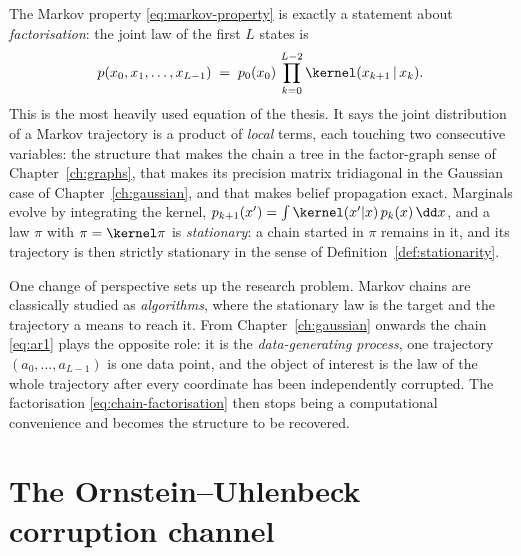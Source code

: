 The Markov property \eqref{eq:markov-property} is exactly a statement about
\emph{factorisation}: the joint law of the first $L$ states is
\begin{equation}
  p(x_0, x_1, \dots, x_{L-1})
  \;=\; p_0(x_0)\, \prod_{k=0}^{L-2} \kernel(x_{k+1} \,|\, x_k) .
  \label{eq:chain-factorisation}
\end{equation}
This is the most heavily used equation of the thesis. It says the joint
distribution of a Markov trajectory is a product of \emph{local} terms, each
touching two consecutive variables: the structure that makes the chain a tree
in the factor-graph sense of Chapter~\ref{ch:graphs}, that makes its precision
matrix tridiagonal in the Gaussian case of Chapter~\ref{ch:gaussian}, and that
makes belief propagation exact. Marginals evolve by integrating the kernel,
$p_{k+1}(x') = \int \kernel(x'|x)\, p_k(x)\,\dd x$, and a law $\pi$ with
$\pi = \kernel \pi$ is \emph{stationary}: a chain started in $\pi$ remains in
it, and its trajectory is then strictly stationary in the sense of
Definition~\ref{def:stationarity}.

One change of perspective sets up the research problem. Markov chains are
classically studied as \emph{algorithms}, where the stationary law is the target
and the trajectory a means to reach it. From Chapter~\ref{ch:gaussian} onwards
the chain \eqref{eq:ar1} plays the opposite role: it is the
\emph{data-generating process}, one trajectory $(a_0, \dots, a_{L-1})$ is one
data point, and the object of interest is the law of the whole trajectory after
every coordinate has been independently corrupted. The factorisation
\eqref{eq:chain-factorisation} then stops being a computational convenience and
becomes the structure to be recovered.

\section{The Ornstein--Uhlenbeck corruption channel}\label{sec:ou}


